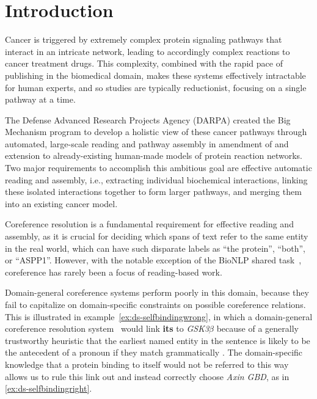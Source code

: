 \section{Introduction}


Cancer is triggered by extremely complex protein signaling pathways that interact in an intricate network, leading to accordingly complex reactions to cancer treatment drugs. This complexity, combined with the rapid pace of publishing in the biomedical domain, makes these systems effectively intractable for human experts, and so studies are typically reductionist, focusing on a single pathway at a time.

The Defense Advanced Research Projects Agency (DARPA) created the Big Mechanism program \cite{cohen2015bmp} to develop a holistic view of these cancer pathways through automated, large-scale reading and pathway assembly in amendment of and extension to already-existing human-made models of protein reaction networks. Two major requirements to accomplish this ambitious goal are effective automatic reading and assembly, i.e., extracting individual biochemical interactions, linking these isolated interactions together to form larger pathways, and merging them into an existing cancer model. 

Coreference resolution is a fundamental requirement for effective reading and assembly, as it is crucial for deciding which spans of text refer to the same entity in the real world, which can have such disparate labels as ``the protein'', ``both'', or ``ASPP1''. 
However, with the notable exception of the BioNLP shared task~\cite{kim2013ge}, coreference has rarely been a focus of reading-based work.

Domain-general coreference systems perform poorly in this domain, because they fail to capitalize on domain-specific constraints on possible coreference relations. This is illustrated in example~\ref{ex:ds-selfbindingwrong}, in which a domain-general coreference resolution system~\cite{lee2013sieve} would link {\bf its} to {\it GSK3$\beta$} because of a generally trustworthy heuristic that the earliest named entity in the sentence is likely to be the antecedent of a pronoun if they match grammatically \cite{hobbs1978}. The domain-specific knowledge that a protein binding to itself would not be referred to this way allows us to rule this link out and instead correctly choose {\it Axin GBD}, as in \ref{ex:ds-selfbindingright}.

